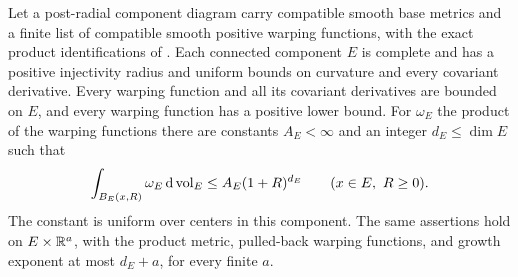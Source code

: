 \begin{lemma}\label{component:geometry}
Let a post-radial component diagram carry compatible smooth base
metrics and a finite list of compatible smooth positive warping functions, with
the exact product identifications of . Each
connected component $E$ is complete and
has a positive injectivity radius and uniform bounds on curvature and
every covariant derivative.  Every warping function and all its
covariant derivatives are bounded on $E$, and every warping function has a positive
lower bound.  For $\omega_E$ the product of the warping functions there are constants
$A_E<\infty$ and an integer $d_E\le\dim E$ such that
\begin{equation}\label{component:growth}
 \int_{B_E(x,R)}\omega_E\,\mathrm d\operatorname{vol}_E
       \le A_E(1+R)^{d_E}
       \qquad(x\in E,\ R\ge0).
\end{equation}
The constant is uniform over centers in this component.  The same assertions
hold on $E\times\mathbb R^a$, with the product metric, pulled-back warping functions,
and growth exponent at most $d_E+a$, for every finite $a$.
\end{lemma}

